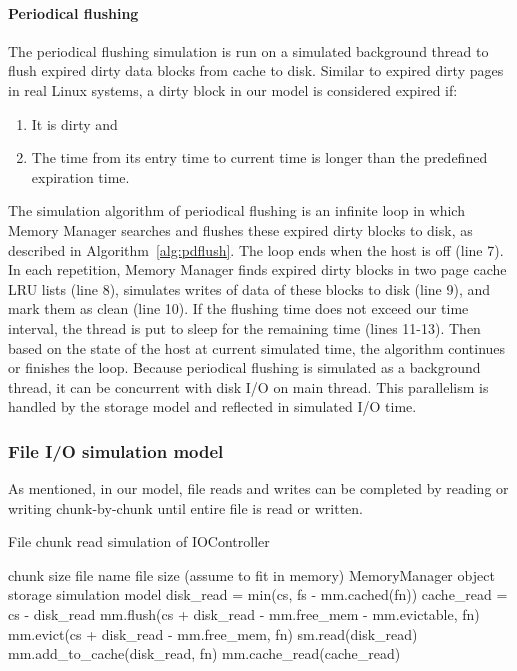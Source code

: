 \documentclass[conference]{IEEEtran}
\newcommand{\Desc}[2]{\State \makebox[2em][l]{#1}#2}
\begin{document}
			\paragraph*{Periodical flushing}	
			The periodical flushing simulation is run on a simulated background thread 
			to flush expired dirty data blocks from cache to disk.
			Similar to expired dirty pages in real Linux systems, a dirty block in our model 
			is considered expired if: 
			\begin{enumerate}
				\item It is dirty and 
				\item The time from its entry time to current time is longer than the 
				predefined expiration time. 
			\end{enumerate}
			The simulation algorithm of periodical flushing is an infinite loop in which 
			Memory Manager searches and flushes these expired dirty blocks to disk, 
			as described in Algorithm~\ref{alg:pdflush}. 
			The loop ends when the host is off (line 7). 
			In each repetition, Memory Manager finds expired dirty blocks in two 
			page cache LRU lists (line 8), simulates writes of data of these blocks 
			to disk (line 9), and mark them as clean (line 10).
			If the flushing time does not exceed our time interval, the thread is put 
			to sleep for the remaining time (lines 11-13). 
			Then based on the state of the host at current simulated time, 
			the algorithm continues or finishes the loop.
			Because periodical flushing is simulated as a background thread, it can be 
			concurrent with disk I/O on main thread. This parallelism is handled by the 
			storage model and reflected in simulated I/O time.

			\subsubsection{File I/O simulation model}
			 
			As mentioned, in our model, file reads and writes can be completed by 
			reading or writing chunk-by-chunk until entire file is read or written.
			
			\begin{algorithm}\caption{File chunk read simulation of IOController}
			\label{alg:read}
				\small
				\begin{algorithmic}[1]
					\Input
        				\Desc{cs}{chunk size}
        				\Desc{fn}{file name}
        				\Desc{fs}{file size (assume to fit in memory)}
						\Desc{mm}{MemoryManager object}
						\Desc{sm}{storage simulation model}
   					\EndInput
   					\State disk\_read = min(cs, fs - mm.cached(fn))
   					\State cache\_read = cs - disk\_read
					\State mm.flush(cs + disk\_read - mm.free\_mem - mm.evictable, fn) 
					\State mm.evict(cs + disk\_read - mm.free\_mem, fn) 
					  	
						\State sm.read(disk\_read)  
						\State mm.add\_to\_cache(disk\_read, fn) 	
					\EndIf
					 
						\State mm.cache\_read(cache\_read)  
					\EndIf
				\end{algorithmic}
			\end{algorithm}			
\end{document}

